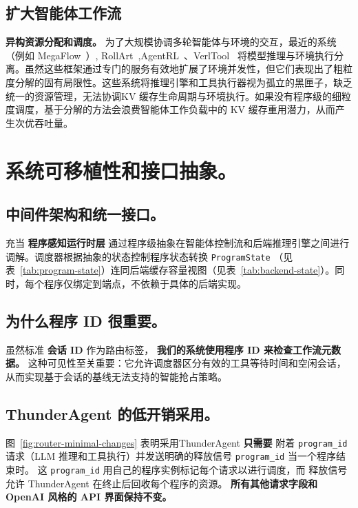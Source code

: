 \subsection{扩大智能体工作流}
\label{sec:rl_scale}
\textbf{异构资源分配和调度。}
为了大规模协调多轮智能体与环境的交互，最近的系统（例如 MegaFlow~）\cite{zhang2026megaflow}, RollArt~\cite{gao2025rollart,wang2025let},AgentRL~\cite{zhang2025agentrl}、VerlTool~\cite{jiang2025verltool} 将模型推理与环境执行分离。虽然这些框架通过专门的服务有效地扩展了环境并发性，但它们表现出了粗粒度分解的固有局限性。这些系统将推理引擎和工具执行器视为孤立的黑匣子，缺乏统一的资源管理，无法协调KV 缓存生命周期与环境执行。如果没有程序级的细粒度调度，基于分解的方法会浪费智能体工作负载中的 KV 缓存重用潜力，从而产生次优吞吐量。

\newpage

\section{系统可移植性和接口抽象。}
\label{app:easy_intergrate}
\subsection{中间件架构和统一接口。}
\noindent \ouralg 充当 \textbf{程序感知运行时层} 通过程序级抽象在智能体控制流和后端推理引擎之间进行调解。调度器根据抽象的状态控制程序状态转换 \texttt{ProgramState} （见表~\ref{tab:program-state}）连同后端缓存容量视图（见表~\ref{tab:backend-state}）。同时，每个程序仅绑定到端点，不依赖于具体的后端实现。

\subsection{为什么程序 ID 很重要。}

虽然标准 \textbf{会话 ID} 作为路由标签， \textbf{我们的系统使用程序 ID 来检查工作流元数据。} 这种可见性至关重要：它允许调度器区分有效的工具等待时间和空闲会话，从而实现基于会话的基线无法支持的智能抢占策略。

\subsection{ThunderAgent 的低开销采用。}
图~\ref{fig:router-minimal-changes} 表明采用ThunderAgent \textbf{只需要} 附着 \texttt{program\_id} 请求（LLM 推理和工具执行）并发送明确的释放信号 \texttt{program\_id} 当一个程序结束时。
这 \texttt{program\_id} 用自己的程序实例标记每个请求以进行调度，而
释放信号允许 ThunderAgent 在终止后回收每个程序的资源。
\textbf{所有其他请求字段和 OpenAI 风格的 API 界面保持不变。}

